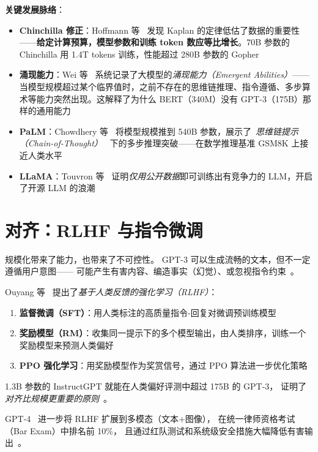 \documentclass[10pt, openany]{book}
\begin{document}
\noindent \textbf{关键发展脉络}：
\begin{itemize}
    \item \textbf{Chinchilla 修正}：Hoffmann 等~\cite{Hoffmann2022Chinchilla} 发现 Kaplan 的定律低估了数据的重要性——\textbf{给定计算预算，模型参数和训练 token 数应等比增长}。70B 参数的 Chinchilla 用 1.4T tokens 训练，性能超过 280B 参数的 Gopher
    \item \textbf{涌现能力}：Wei 等~\cite{Wei2022Emergent} 系统记录了大模型的\emph{涌现能力（Emergent Abilities）}——当模型规模超过某个临界值时，之前不存在的思维链推理、指令遵循、多步算术等能力突然出现。这解释了为什么 BERT（340M）没有 GPT-3（175B）那样的通用能力
    \item \textbf{PaLM}：Chowdhery 等~\cite{Chowdhery2022PaLM} 将模型规模推到 540B 参数，展示了~\emph{思维链提示（Chain-of-Thought）}~\cite{Wei2022ChainOfThought} 下的多步推理突破——在数学推理基准 GSM8K 上接近人类水平
    \item \textbf{LLaMA}：Touvron 等~\cite{Touvron2023LLaMA} 证明\emph{仅用公开数据}即可训练出有竞争力的 LLM，开启了开源 LLM 的浪潮
\end{itemize}

\section{对齐：RLHF 与指令微调}

规模化带来了能力，也带来了不可控性。
GPT-3 可以生成流畅的文本，但不一定遵循用户意图——
可能产生有害内容、编造事实（幻觉）、或忽视指令约束~\cite{OpenAI2023GPT4,Kadavath2022SelfEvaluation}。

Ouyang 等~\cite{Ouyang2022InstructGPT} 提出了\emph{基于人类反馈的强化学习（RLHF）}：
\begin{enumerate}
    \item \textbf{监督微调（SFT）}：用人类标注的高质量指令-回复对微调预训练模型
    \item \textbf{奖励模型（RM）}：收集同一提示下的多个模型输出，由人类排序，训练一个奖励模型来预测人类偏好
    \item \textbf{PPO 强化学习}：用奖励模型作为奖赏信号，通过 PPO 算法进一步优化策略
\end{enumerate}
1.3B 参数的 InstructGPT 就能在人类偏好评测中超过 175B 的 GPT-3，
证明了\emph{对齐比规模更重要的原则}~\cite{Ouyang2022InstructGPT}。

GPT-4~\cite{OpenAI2023GPT4,Achiam2025GPT4System} 进一步将 RLHF 扩展到多模态（文本+图像），
在统一律师资格考试（Bar Exam）中排名前 10\%，
且通过红队测试和系统级安全措施大幅降低有害输出~\cite{OpenAI2023GPT4}。
\end{document}

